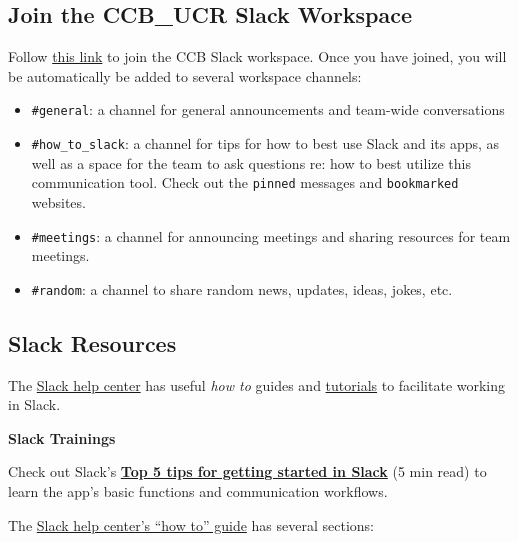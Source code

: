\documentclass[
]{book}
\providecommand{\tightlist}{%
  \setlength{\itemsep}{0pt}\setlength{\parskip}{0pt}}
\begin{document}
\hypertarget{join-the-ccb_ucr-slack-workspace}{%
\subsection{Join the CCB\_UCR Slack Workspace}\label{join-the-ccb_ucr-slack-workspace}}

Follow \href{https://join.slack.com/t/ccbucr/shared_invite/zt-1dfpaguqs-F4CAPCI4ILMvT0JOcSpnag}{this link} to join the CCB Slack workspace. Once you have joined, you will be automatically be added to several workspace channels:

\begin{itemize}
\tightlist
\item
  \texttt{\#general}: a channel for general announcements and team-wide conversations
\item
  \texttt{\#how\_to\_slack}: a channel for tips for how to best use Slack and its apps, as well as a space for the team to ask questions re: how to best utilize this communication tool. Check out the \texttt{pinned} messages and \texttt{bookmarked} websites.
\item
  \texttt{\#meetings}: a channel for announcing meetings and sharing resources for team meetings.
\item
  \texttt{\#random}: a channel to share random news, updates, ideas, jokes, etc.
\end{itemize}

\hypertarget{slack-resources}{%
\subsection{Slack Resources}\label{slack-resources}}

The \href{https://slack.com/help/articles/360059928654-How-to-use-Slack--your-quick-start-guide}{Slack help center} has useful \emph{how to} guides and \href{https://slack.com/help/articles/360059976673-Slack-video-tutorials}{tutorials} to facilitate working in Slack.

\textbf{Slack Trainings}

Check out Slack's \href{https://slack.com/intl/en-in/resources/using-slack/top-5-tips-for-getting-started-in-slack}{\textbf{Top 5 tips for getting started in Slack}} (5 min read) to learn the app's basic functions and communication workflows.

The \href{https://slack.com/help/articles/360059928654-How-to-use-Slack--your-quick-start-guide}{Slack help center's ``how to'' guide} has several sections:
\end{document}
